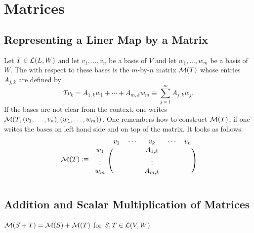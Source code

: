 \section{Matrices}
\subsection{Representing a Liner Map by a Matrix}

\setcounter{thm}{30}
\begin{mydef}
  \label{def: matrix of a linear map}
  Let $T \in \mathcal{L} (L,W)$ and let $v_1, \dots, v_n$ be a basis of $V$ and let $w_1, \dots, w_m$ be a basis of $W$. The  with respect to these bases is the $m$-by-$n$ matrix $\mathcal{M}(T)$ whose entries $A_{j,k}$ are defined by
  \begin{equation}
    T v_k = A_{1,k} w_1 + \cdots + A_{m,k} w_m \equiv \sum_{j=1}^{m} A_{j,k} w_j.
  \end{equation}
  If the bases are not clear from the context, one writes $\mathcal{M}(T, (v_1, \dots, v_n),(w_1, \dots, w_m))$. One remembers how to construct $\mathcal{M}(T)$, if one writes the bases on left hand side and on top of the matrix. It looks as follows:
  \begin{equation}
    \mathcal{M} (T) :\equiv
      \begin{blockarray}{cccccc}
                 & v_1 & \cdots & v_k     & \cdots & v_n \\
        \begin{block}{c(ccccc)}
          w_1    &     &        & A_{1,k} &        &     \\
          \vdots &     &        & \vdots  &        &     \\
          w_m    &     &        & A_{m,k} &        &     \\
        \end{block}
      \end{blockarray}
  \end{equation}
\end{mydef}

\subsection{Addition and Scalar Multiplication of Matrices}

\setcounter{thm}{34}
\begin{thm}
  $\mathcal{M}(S+T) = \mathcal{M}(S) + \mathcal{M}(T)$ for $S, T \in \mathcal{L} (V,W)$
\end{thm}

